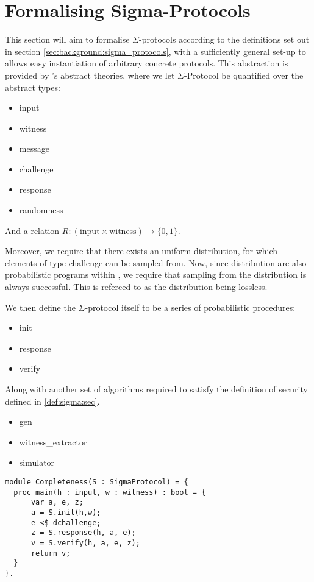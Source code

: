 \chapter{Formalising Sigma-Protocols}
\label{ch:formal_sigma}
This section will aim to formalise $\Sigma$-protocols according to the
definitions set out in section \ref{sec:background:sigma_protocols}, with a
sufficiently general set-up to allows easy instantiation of arbitrary concrete
protocols.
This abstraction is provided by \easycrypt's abstract theories, where we let
$\Sigma$-Protocol be quantified over the abstract types:
\begin{itemize}
  \item input
  \item witness
  \item message
  \item challenge
  \item response
  \item randomness
\end{itemize}

And a relation $R : (\text{input} \times \text{witness}) \rightarrow \{0,1\}$.

Moreover, we require that there exists an uniform distribution, for which
elements of type challenge can be sampled from. Now, since distribution are also
probabilistic programs within \easycrypt, we require that sampling from the
distribution is always successful. This is refereed to as the distribution being lossless.

We then define the $\Sigma$-protocol itself to be a series of probabilistic procedures:
\begin{itemize}
  \item init
  \item response
  \item verify
\end{itemize}


Along with another set of algorithms required to satisfy the definition of
security defined in \ref{def:sigma:sec}.

\begin{itemize}
  \item gen
  \item witness\_extractor
  \item simulator
\end{itemize}

\begin{lstlisting}[float, label=lst:sigma_completeness,caption=Completeness game for $\Sigma$-Protocols]
module Completeness(S : SigmaProtocol) = {
  proc main(h : input, w : witness) : bool = {
      var a, e, z;
      a = S.init(h,w);
      e <$ dchallenge;
      z = S.response(h, a, e);
      v = S.verify(h, a, e, z);
      return v;
  }
}.
\end{lstlisting}

